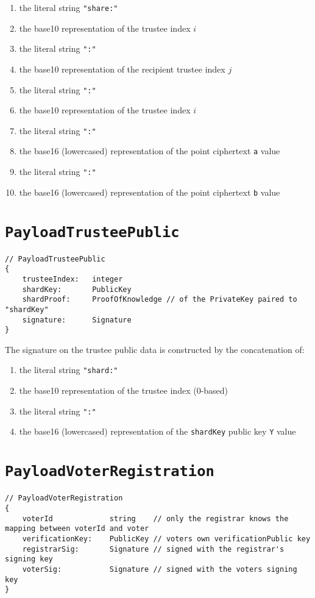 \begin{enumerate}
  \item the literal string \lstinline[style=ES6]{"share:"}
  \item the base10 representation of the trustee index $i$
  \item the literal string \lstinline[style=ES6]{":"}
  \item the base10 representation of the recipient trustee index $j$
  \item the literal string \lstinline[style=ES6]{":"}
  \item the base10 representation of the trustee index $i$
  \item the literal string \lstinline[style=ES6]{":"}
  \item the base16 (lowercased) representation of the point ciphertext \texttt{a} value
  \item the literal string \lstinline[style=ES6]{":"}
  \item the base16 (lowercased) representation of the point ciphertext \texttt{b} value
\end{enumerate}

\section*{\texttt{PayloadTrusteePublic}}
\label{dt:payload:public}
\begin{lstlisting}[style=ES6]
// PayloadTrusteePublic
{
    trusteeIndex:   integer
    shardKey:       PublicKey
    shardProof:     ProofOfKnowledge // of the PrivateKey paired to "shardKey"
    signature:      Signature
}
\end{lstlisting}

The signature on the trustee public data is constructed by the concatenation of:

\begin{enumerate}
  \item the literal string \lstinline[style=ES6]{"shard:"}
  \item the base10 representation of the trustee index (0-based)
  \item the literal string \lstinline[style=ES6]{":"}
  \item the base16 (lowercased) representation of the \texttt{shardKey} public key \texttt{Y} value
\end{enumerate}

\section*{\texttt{PayloadVoterRegistration}}
\label{dt:payload:reg}
\begin{lstlisting}[style=ES6]
// PayloadVoterRegistration
{
    voterId             string    // only the registrar knows the mapping between voterId and voter
    verificationKey:    PublicKey // voters own verificationPublic key
    registrarSig:       Signature // signed with the registrar's signing key
    voterSig:           Signature // signed with the voters signing key
}
\end{lstlisting}

